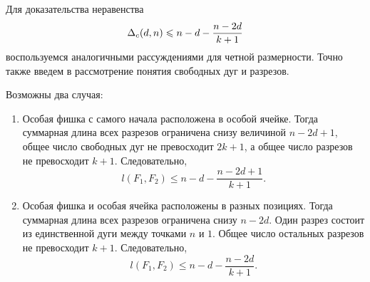Для доказательства неравенства 
\[{\Delta_{c}(d,n)} \leqslant n-d - \frac{n-2d}{k+1}\]
воспользуемся аналогичными рассуждениями для четной размерности. Точно также введем в рассмотрение понятия свободных дуг и разрезов. 

Возможны два случая:
\begin{enumerate}
	\item Особая фишка с самого начала расположена в особой ячейке. Тогда суммарная длина всех разрезов ограничена снизу величиной $n-2d+1$, общее число свободных дуг не превосходит $2k+1$, а общее число разрезов не превосходит $k+1$. Следовательно,
	\[
	l(F_1,F_2)\le n-d - \frac{n-2d+1}{k+1}.
	\]
	\item Особая фишка и особая ячейка расположены в разных позициях. Тогда суммарная длина всех разрезов ограничена снизу $n-2d$. Один разрез состоит из единственной дуги между точками $n$ и $1$. Общее число остальных разрезов не превосходит $k+1$.
	Следовательно,
	\[
	l(F_1,F_2)\le n-d - \frac{n-2d}{k+1}.
	\]
\end{enumerate}

%
%
